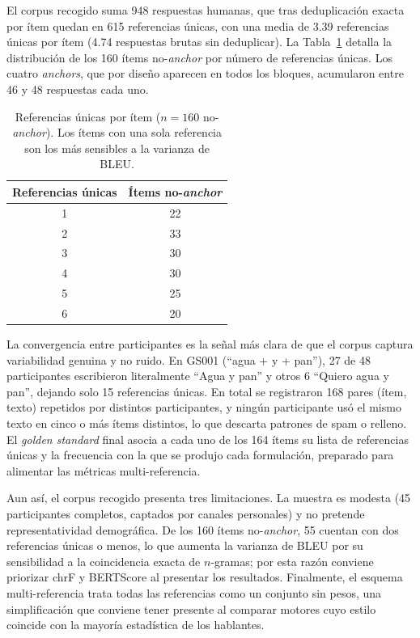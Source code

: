 El corpus recogido suma 948 respuestas humanas, que tras deduplicación exacta por ítem quedan en 615 referencias únicas, con una media de 3.39 referencias únicas por ítem (4.74 respuestas brutas sin deduplicar). La Tabla~\ref{tab:eval-referencias-distribucion} detalla la distribución de los 160 ítems no-\textit{anchor} por número de referencias únicas. Los cuatro \textit{anchors}, que por diseño aparecen en todos los bloques, acumularon entre 46 y 48 respuestas cada uno.

\begin{table}[ht]
\centering
\small
\begin{tabular}{c c}
\hline
Referencias únicas & Ítems no-\textit{anchor} \\
\hline
1 & 22 \\
2 & 33 \\
3 & 30 \\
4 & 30 \\
5 & 25 \\
6 & 20 \\
\hline
\end{tabular}
\caption{Referencias únicas por ítem ($n=160$ no-\textit{anchor}). Los ítems con una sola referencia son los más sensibles a la varianza de BLEU.}
\label{tab:eval-referencias-distribucion}
\end{table}

La convergencia entre participantes es la señal más clara de que el corpus captura variabilidad genuina y no ruido. En GS001 (``agua + y + pan''), 27 de 48 participantes escribieron literalmente ``Agua y pan'' y otros 6 ``Quiero agua y pan'', dejando solo 15 referencias únicas. En total se registraron 168 pares (ítem, texto) repetidos por distintos participantes, y ningún participante usó el mismo texto en cinco o más ítems distintos, lo que descarta patrones de spam o relleno. El \textit{golden standard} final asocia a cada uno de los 164 ítems su lista de referencias únicas y la frecuencia con la que se produjo cada formulación, preparado para alimentar las métricas multi-referencia.

Aun así, el corpus recogido presenta tres limitaciones. La muestra es modesta (45 participantes completos, captados por canales personales) y no pretende representatividad demográfica. De los 160 ítems no-\textit{anchor}, 55 cuentan con dos referencias únicas o menos, lo que aumenta la varianza de BLEU por su sensibilidad a la coincidencia exacta de $n$-gramas; por esta razón conviene priorizar chrF y BERTScore al presentar los resultados. Finalmente, el esquema multi-referencia trata todas las referencias como un conjunto sin pesos, una simplificación que conviene tener presente al comparar motores cuyo estilo coincide con la mayoría estadística de los hablantes.

